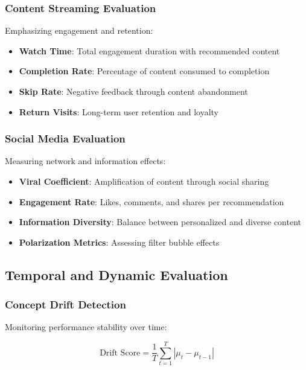 \documentclass[acmsmall,review,anonymous]{acmart}
\begin{document}
\subsubsection{Content Streaming Evaluation}

Emphasizing engagement and retention:

\begin{itemize}
    \item \textbf{Watch Time}: Total engagement duration with recommended content
    \item \textbf{Completion Rate}: Percentage of content consumed to completion
    \item \textbf{Skip Rate}: Negative feedback through content abandonment
    \item \textbf{Return Visits}: Long-term user retention and loyalty
\end{itemize}

\subsubsection{Social Media Evaluation}

Measuring network and information effects:

\begin{itemize}
    \item \textbf{Viral Coefficient}: Amplification of content through social sharing
    \item \textbf{Engagement Rate}: Likes, comments, and shares per recommendation
    \item \textbf{Information Diversity}: Balance between personalized and diverse content
    \item \textbf{Polarization Metrics}: Assessing filter bubble effects
\end{itemize}

\subsection{Temporal and Dynamic Evaluation}

\subsubsection{Concept Drift Detection}

Monitoring performance stability over time:

\begin{equation}
\text{Drift Score} = \frac{1}{T} \sum_{t=1}^T |\mu_{t} - \mu_{t-1}|
\label{eq:drift_score}
\end{equation}
\end{document}

